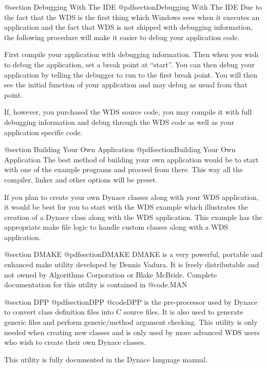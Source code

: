@section Debugging With The IDE
@pdfsection{Debugging With The IDE}
Due to the fact that the WDS is the first thing which Windows sees
when it executes an application and the fact that WDS is not shipped
with debugging information, the following procedure will make it
easier to debug your application code.

First compile your application with debugging information.  Then when you
wish to debug the application, set a break point at ``start''.  You
can then debug your application by telling the debugger to run to the first
break point.  You will then see the initial function of your application
and may debug as usual from that point.

If, however, you purchased the WDS source code, you may compile it
with full debugging information and debug through the WDS code
as well as your application specific code.


@section Building Your Own Application
@pdfsection{Building Your Own Application}
The best method of building your own application would be to start
with one of the example programs and proceed from there.  This way
all the compiler, linker and other options will be preset.  

If you plan to create your own Dynace classes along with your WDS
application, it would be best for you to start with the WDS example
which illustrates the creation of a Dynace class along with the WDS
application.  This example has the appropriate make file logic to
handle custom classes along with a WDS application.

@section DMAKE
@pdfsection{DMAKE}
DMAKE is a very powerful, portable and enhanced make utility developed
by Dennis Vadura.  It is freely distributable and not owned by
Algorithms Corporation or Blake McBride.  Complete documentation for this utility
is contained in @code{\DYNACE\DOCS\DMAKE.MAN}

@section DPP
@pdfsection{DPP}
@code{DPP} is the pre-processor used by Dynace to convert class definition
files into C source files.  It is also used to generate generic files
and perform generic/method argument checking.  This utility is only needed
when creating new classes and is only used by more advanced WDS users
who wish to create their own Dynace classes.

This utility is fully documented in the Dynace language manual.



